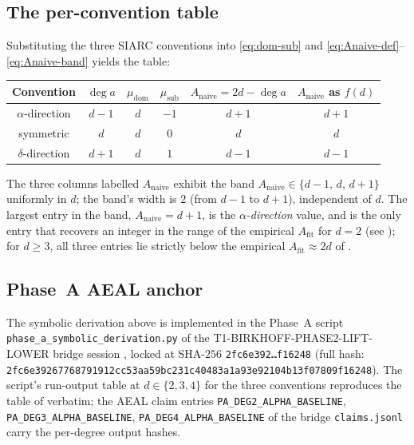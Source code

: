\documentclass[11pt,reqno]{amsart}
\theoremstyle{plain}
\theoremstyle{definition}
\theoremstyle{remark}
\newcommand{\Anaive}{A_{\mathrm{naive}}}
\newcommand{\Afit}{A_{\mathrm{fit}}}
\newcommand{\dega}{\deg a}
\begin{document}
\subsection{The per-convention table}
\label{sec:wz-table}
Substituting the three SIARC conventions into \eqref{eq:dom-sub}
and \eqref{eq:Anaive-def}--\eqref{eq:Anaive-band} yields the
table:

\begin{center}
\begin{tabular}{c c c c c c}
\toprule
Convention & $\dega$ & $\mu_{\mathrm{dom}}$ & $\mu_{\mathrm{sub}}$
  & $\Anaive = 2d - \dega$ & $\Anaive$ as $f(d)$\\
\midrule
$\alpha$-direction & $d-1$ & $d$ & $-1$ & $d + 1$ & $d+1$\\
symmetric          & $d$   & $d$ & $0$  & $d$     & $d$\\
$\delta$-direction & $d+1$ & $d$ & $1$  & $d - 1$ & $d-1$\\
\bottomrule
\end{tabular}
\end{center}

The three columns labelled $\Anaive$ exhibit the band
$\Anaive \in \{d-1,\,d,\,d+1\}$ uniformly in $d$; the
band's width is $2$ (from $d-1$ to $d+1$), independent of $d$.
The largest entry in the band, $\Anaive = d+1$, is the
\emph{$\alpha$-direction} value, and is the only entry that
recovers an integer in the range of the empirical $\Afit$
for $d = 2$ (see ); for $d \ge 3$, all
three entries lie strictly below the empirical $\Afit \approx 2d$
of \cite{papanokechi_pcf2_v13}.

\subsection{Phase~A AEAL anchor}
\label{sec:wz-aeal}
The symbolic derivation above is implemented in the Phase~A
script \texttt{phase\_a\_symbolic\_derivation.py} of the
T1-BIRKHOFF-PHASE2-LIFT-LOWER bridge session
\cite{siarc_t1_phase2}, locked at SHA-$256$
\texttt{2fc6e392\dots f16248} (full hash:
\texttt{2fc6e39267768791912cc53aa59bc231c40483a1a93e92104b13f07809f16248}).
The script's run-output table at $d \in \{2, 3, 4\}$ for the three
conventions reproduces the table of  verbatim;
the AEAL claim entries \texttt{PA\_DEG2\_ALPHA\_BASELINE},
\texttt{PA\_DEG3\_ALPHA\_BASELINE}, \texttt{PA\_DEG4\_ALPHA\_BASELINE}
of the bridge \texttt{claims.jsonl} carry the per-degree
output hashes.
\end{document}
